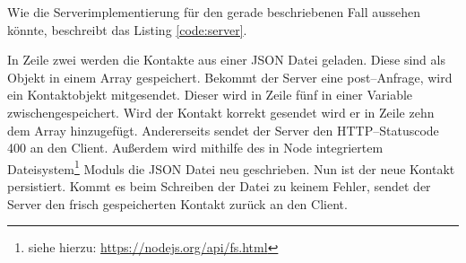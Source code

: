Wie die Serverimplementierung für den gerade beschriebenen Fall aussehen könnte, beschreibt das Listing \ref{code:server}.
%
\begin{center}  
\end{center}
%
In Zeile zwei werden die Kontakte aus einer \gls{JSON} Datei geladen. Diese sind als Objekt in einem Array gespeichert. Bekommt der Server eine post--Anfrage, wird ein Kontaktobjekt mitgesendet. Dieser wird in Zeile fünf in einer Variable zwischengespeichert. 
Wird der Kontakt korrekt gesendet wird er in Zeile zehn dem Array hinzugefügt. Andererseits sendet der Server den HTTP--Statuscode 400 an den Client. %
Außerdem wird mithilfe des in Node integriertem Dateisystem\footnote{siehe hierzu: \url{https://nodejs.org/api/fs.html}} Moduls die \gls{JSON} Datei neu geschrieben. Nun ist der neue Kontakt persistiert. Kommt es beim Schreiben der Datei zu keinem Fehler, sendet der Server den frisch gespeicherten Kontakt zurück an den Client.